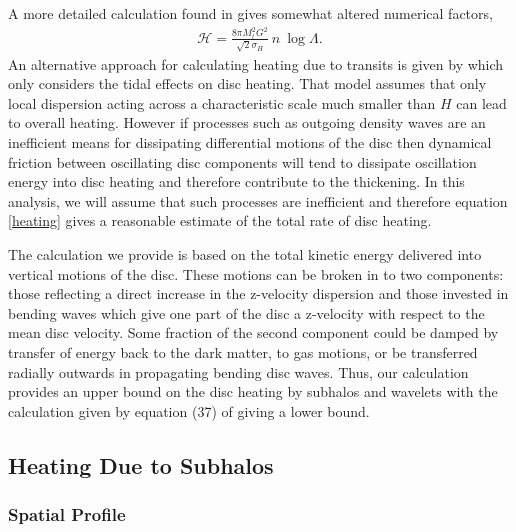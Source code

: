 \documentclass[usenatbib]{mnras}
\begin{document}
A more detailed calculation found in \cite{milkywayblackholes} gives somewhat altered numerical factors,
\begin{align} \label{heating}
\mathcal{H} = \frac{8 \pi M_l^2 G^2}{\sqrt{2} \sigma_H} \: n \: \log{\Lambda}.
\end{align}
An alternative approach for calculating heating due to transits is given by \cite{ultralight} which only considers the tidal effects on disc heating. That model assumes that only local dispersion acting across a characteristic scale much smaller than $H$ can lead to overall heating. However if processes such as outgoing density waves are an inefficient means for dissipating differential motions of the disc then dynamical friction between oscillating disc components will tend to dissipate oscillation energy into disc heating and therefore contribute to the thickening. In this analysis, we will assume that such processes are inefficient and therefore equation \eqref{heating} gives a reasonable estimate of the total rate of disc heating.  
\par	
	The calculation we provide is based on the total kinetic energy delivered into vertical motions of the disc. These motions can be broken in to two components: those reflecting a direct increase in the z-velocity dispersion and those invested in bending waves which give one part of the disc a z-velocity with respect to the mean disc velocity. Some fraction of the second component could be damped by transfer of energy back to the dark matter, to gas motions, or be transferred radially outwards in propagating bending disc waves. Thus, our calculation provides an upper bound on the disc heating by subhalos and wavelets with the calculation given by equation (37) of \cite{ultralight} giving a lower bound.   	

\subsection{Heating Due to Subhalos}

\subsubsection{Spatial Profile}
\end{document}
